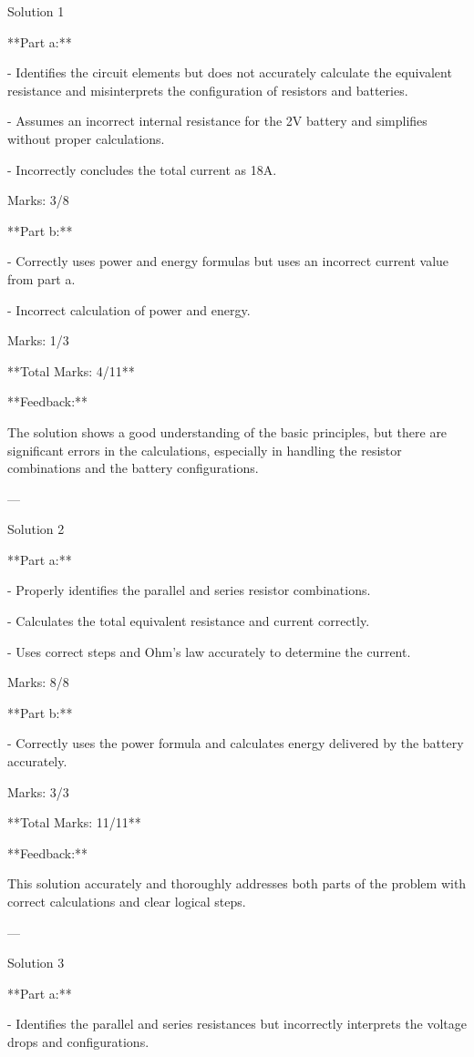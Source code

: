 \documentclass[a4paper,11pt]{article}
\begin{document}
Solution 1

**Part a:**

- Identifies the circuit elements but does not accurately calculate the equivalent resistance and misinterprets the configuration of resistors and batteries.

- Assumes an incorrect internal resistance for the 2V battery and simplifies without proper calculations.

- Incorrectly concludes the total current as 18A.

Marks: 3/8

**Part b:**

- Correctly uses power and energy formulas but uses an incorrect current value from part a.

- Incorrect calculation of power and energy.

Marks: 1/3

**Total Marks: 4/11**

**Feedback:**

The solution shows a good understanding of the basic principles, but there are significant errors in the calculations, especially in handling the resistor combinations and the battery configurations.

---

Solution 2

**Part a:**

- Properly identifies the parallel and series resistor combinations.

- Calculates the total equivalent resistance and current correctly.

- Uses correct steps and Ohm's law accurately to determine the current.

Marks: 8/8

**Part b:**

- Correctly uses the power formula and calculates energy delivered by the battery accurately.

Marks: 3/3

**Total Marks: 11/11**

**Feedback:**

This solution accurately and thoroughly addresses both parts of the problem with correct calculations and clear logical steps.

---

Solution 3

**Part a:**

- Identifies the parallel and series resistances but incorrectly interprets the voltage drops and configurations.
\end{document}
